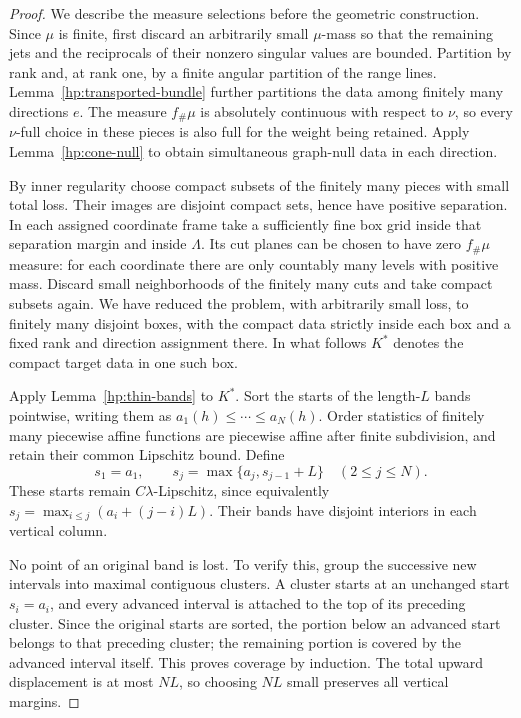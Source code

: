 \begin{proof}
We describe the measure selections before the geometric construction.
Since $\mu$ is finite, first discard an arbitrarily small $\mu$-mass so
that the remaining jets and the reciprocals of their nonzero singular
values are bounded.  Partition by rank and, at rank one, by a finite
angular partition of the range lines.  Lemma~\ref{hp:transported-bundle}
further partitions the data among finitely many directions $e$.
The measure $f_\#\mu$ is absolutely continuous with respect to $\nu$,
so every $\nu$-full choice in these pieces is also full for the
weight being retained.  Apply Lemma~\ref{hp:cone-null} to obtain
simultaneous graph-null data in each direction.

By inner regularity choose compact subsets of the finitely many
pieces with small total loss.  Their images are disjoint compact
sets, hence have positive separation.  In each assigned coordinate
frame take a sufficiently fine box grid inside that separation
margin and inside $\Lambda$.  Its cut planes can be chosen to have
zero $f_\#\mu$ measure: for each coordinate there are only countably
many levels with positive mass.  Discard small neighborhoods of the
finitely many cuts and take compact subsets again.  We have reduced
the problem, with arbitrarily small loss, to finitely many disjoint
boxes, with the compact data strictly inside each box and a fixed
rank and direction assignment there.  In what follows $K^*$ denotes
the compact target data in one such box.

Apply Lemma~\ref{hp:thin-bands} to $K^*$.  Sort the starts of the
length-$L$ bands pointwise, writing them as
$a_1(h)\le\cdots\le a_N(h)$.  Order statistics of finitely many
piecewise affine functions are piecewise affine after finite
subdivision, and retain their common Lipschitz bound.  Define
\begin{equation}\label{hp:separated-band-starts}
 s_1=a_1,\qquad s_j=\max\{a_j,s_{j-1}+L\}\quad(2\le j\le N).
\end{equation}
These starts remain $C\lambda$-Lipschitz, since equivalently
$s_j=\max_{i\le j}(a_i+(j-i)L)$.  Their bands have disjoint
interiors in each vertical column.

No point of an original band is lost.  To verify this, group the
successive new intervals into maximal contiguous clusters.  A cluster
starts at an unchanged start $s_i=a_i$, and every advanced interval
is attached to the top of its preceding cluster.  Since the original
starts are sorted, the portion below an advanced start belongs to
that preceding cluster; the remaining portion is covered by the
advanced interval itself.  This proves coverage by induction.
The total upward displacement is at most $NL$, so choosing $NL$
small preserves all vertical margins.


\end{proof}
